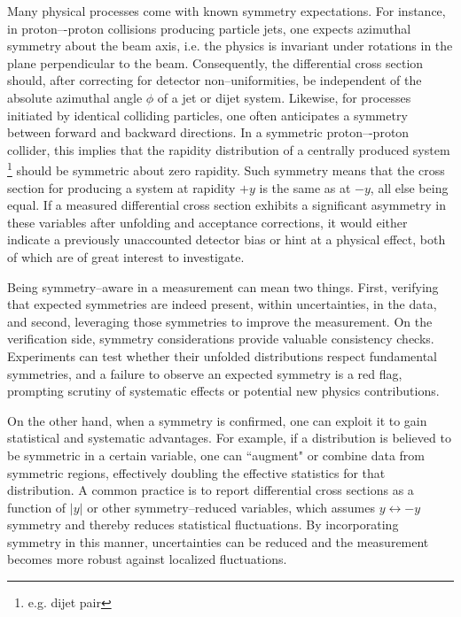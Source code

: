         Many physical processes come with known symmetry expectations.
        For instance, in proton–-proton collisions producing particle jets, one expects azimuthal symmetry about the beam axis, i.e. the physics is invariant under rotations in the plane perpendicular to the beam.
        Consequently, the differential cross section should, after correcting for detector non--uniformities, be independent of the absolute azimuthal angle $\phi$ of a jet or dijet system.
        Likewise, for processes initiated by identical colliding particles, one often anticipates a symmetry between forward and backward directions.
        In a symmetric proton–-proton collider, this implies that the rapidity distribution of a centrally produced system \footnote{e.g. dijet pair} should be symmetric about zero rapidity.
        Such symmetry means that the cross section for producing a system at rapidity $+y$ is the same as at $-y$, all else being equal.
        If a measured differential cross section exhibits a significant asymmetry in these variables after unfolding and acceptance corrections, it would either indicate a previously unaccounted detector bias or hint at a physical effect, both of which are of great interest to investigate.

        Being symmetry--aware in a measurement can mean two things.
        First, verifying that expected symmetries are indeed present, within uncertainties, in the data, and second, leveraging those symmetries to improve the measurement.
        On the verification side, symmetry considerations provide valuable consistency checks.
        Experiments can test whether their unfolded distributions respect fundamental symmetries, and a failure to observe an expected symmetry is a red flag, prompting scrutiny of systematic effects or potential new physics contributions.

        On the other hand, when a symmetry is confirmed, one can exploit it to gain statistical and systematic advantages.
        For example, if a distribution is believed to be symmetric in a certain variable, one can ``augment" or combine data from symmetric regions, effectively doubling the effective statistics for that distribution.
        A common practice is to report differential cross sections as a function of $|y|$ or other symmetry--reduced variables, which assumes $y \leftrightarrow -y$ symmetry and thereby reduces statistical fluctuations.
        By incorporating symmetry in this manner, uncertainties can be reduced and the measurement becomes more robust against localized fluctuations.

